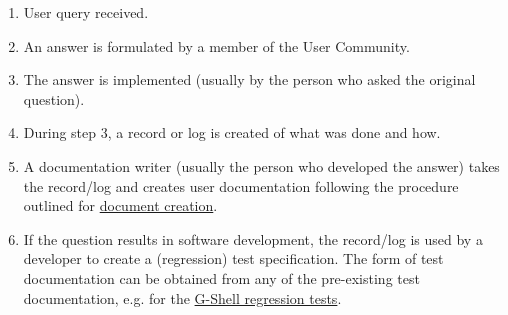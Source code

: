 \documentclass[12pt]{article}
\begin{document}
\begin{enumerate}
\item User query received.
\item An answer is formulated by a member of the User Community.
\item The answer is implemented (usually by the person who asked the original question).
\item During step 3, a record or log is created of what was done and how.
\item A documentation writer (usually the person who developed the answer) takes the record/log and creates user documentation following the procedure outlined for \href{../document-create/document-create.tex}{document creation}.
\item If the question results in software development, the record/log is used by a developer to create a (regression) test specification. The form of test documentation can be obtained from any of the pre-existing test documentation, e.g. for the \href{../tests-gshell/tests-gshell.tex}{G-Shell regression tests}.
\end{enumerate}
\end{document}
